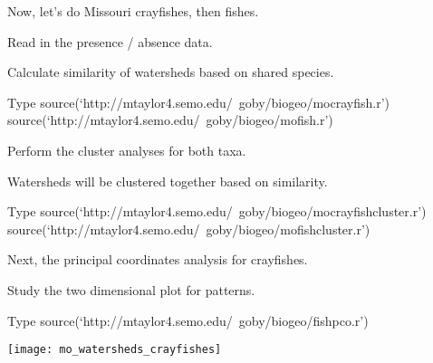 \documentclass[t]{beamer}
\begin{document}
\begin{frame}[plain]{Now, let's do Missouri crayfishes, then fishes.}

	\hangpara Read in the presence / absence data.
	
	\hangpara Calculate similarity of watersheds based on shared species.

\begin{block}{Type}
	source(`http://mtaylor4.semo.edu/~goby/biogeo/mocrayfish.r') \pause
	source(`http://mtaylor4.semo.edu/~goby/biogeo/mofish.r')
\end{block}
\end{frame}

\begin{frame}[plain]{Perform the cluster analyses for both taxa.}

	\hangpara Watersheds will be clustered together based on similarity. 

\begin{block}{Type}
	source(`http://mtaylor4.semo.edu/~goby/biogeo/mocrayfishcluster.r')
	\pause
	source(`http://mtaylor4.semo.edu/~goby/biogeo/mofishcluster.r')
\end{block}
\end{frame}


{
\begin{frame}[plain]
\end{frame}
}

{
\begin{frame}[plain]
\end{frame}
}

\begin{frame}[plain]{Next, the principal coordinates analysis for crayfishes.}

	\hangpara Study the two dimensional plot for patterns.

\begin{block}{Type}
	source(`http://mtaylor4.semo.edu/~goby/biogeo/fishpco.r')
\end{block}
\end{frame}


{
\begin{frame}[plain]
\end{frame}
}

\begin{frame}[plain]
	\centering
	\texttt{[image: mo\_watersheds\_crayfishes]}
\end{frame}
\end{document}
